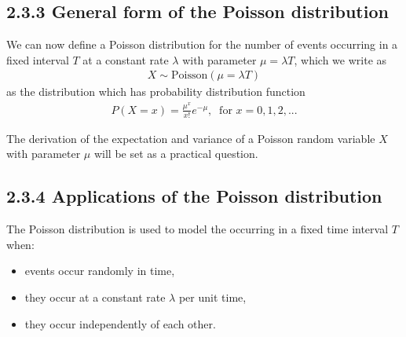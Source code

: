 \documentclass[letterpaper,10pt,english]{jupyterBook}
\begin{document}
\subsection{2.3.3 General form of the Poisson distribution}
\label{\detokenize{02.d. Probability.Discrete:general-form-of-the-poisson-distribution}}
\sphinxAtStartPar
We can now define a Poisson distribution for the number of events occurring in a fixed interval \(T\) at a constant rate \(\lambda\) with parameter \(\mu=\lambda T\), which we write as
\begin{equation*}
\begin{split}
X \sim \mbox{Poisson}(\mu=\lambda T)
\end{split}
\end{equation*}
\sphinxAtStartPar
as the distribution which has probability distribution function
\begin{equation*}
\begin{split}
P(X=x) = \frac{\mu^{x}}{x!} e^{-\mu}, \ \mbox{ for } x=0,1,2,...
\end{split}
\end{equation*}
\sphinxAtStartPar
{}

\sphinxAtStartPar
The derivation of the expectation and variance of a Poisson random variable \(X\) with parameter \(\mu\) will be set as a practical question.


\subsection{2.3.4 Applications of the Poisson distribution}
\label{\detokenize{02.d. Probability.Discrete:applications-of-the-poisson-distribution}}
\sphinxAtStartPar
{}

\sphinxAtStartPar
The Poisson distribution is used to model the  occurring in a fixed time interval \(T\) when:
\begin{itemize}
\item {} 
\sphinxAtStartPar
events occur randomly in time,

\item {} 
\sphinxAtStartPar
they occur at a constant rate \(\lambda\) per unit time,

\item {} 
\sphinxAtStartPar
they occur independently of each other.

\end{itemize}
\end{document}

